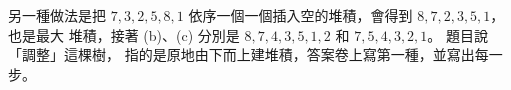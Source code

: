 \begin{pastsoln}
另一種做法是把 $7, 3, 2, 5, 8, 1$ 依序一個一個插入空的堆積，會得到 $8, 7, 2, 3, 5, 1$，也是最大
堆積，接著 (b)、(c) 分別是 $8, 7, 4, 3, 5, 1, 2$ 和 $7, 5, 4, 3, 2, 1$。 題目說「調整」這棵樹，
指的是原地由下而上建堆積，答案卷上寫第一種，並寫出每一步。
\end{pastsoln}
